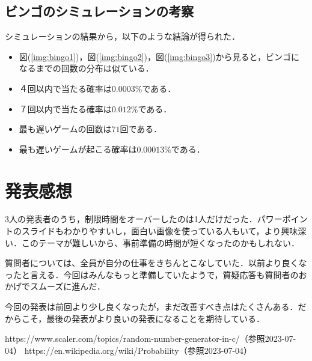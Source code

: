 \documentclass[a4j, titlepage]{jarticle}
\begin{document}
      \subsection{ビンゴのシミュレーションの考察}
      シミュレーションの結果から，以下のような結論が得られた．
      \begin{screen}
        \begin{itemize}
          \item 図(\ref{img:bingo1})，図(\ref{img:bingo2})，図(\ref{img:bingo3})から見ると，ビンゴになるまでの回数の分布は似ている．
          \item ４回以内で当たる確率は$0.0003\%$である．
          \item ７回以内で当たる確率は$0.012\%$である．
          \item 最も遅いゲームの回数は$71$回である．
          \item 最も遅いゲームが起こる確率は$0.00013\%$である．
        \end{itemize}
      \end{screen}

    \section{発表感想}
      3人の発表者のうち，制限時間をオーバーしたのは1人だけだった．パワーポイントのスライドもわかりやすいし，面白い画像を使っている人もいて，より興味深い．このテーマが難しいから、事前準備の時間が短くなったのかもしれない．

      質問者については、全員が自分の仕事をきちんとこなしていた．以前より良くなったと言える．今回はみんなもっと準備していたようで，質疑応答も質問者のおかげでスムーズに進んだ．

      今回の発表は前回より少し良くなったが，まだ改善すべき点はたくさんある．だからこそ，最後の発表がより良いの発表になることを期待している．

    \begin{thebibliography}{99}
      https://www.scaler.com/topics/random-number-generator-in-c/（参照2023-07-04）
      https://en.wikipedia.org/wiki/Probability（参照2023-07-04）
    \end{thebibliography}
\end{document}
